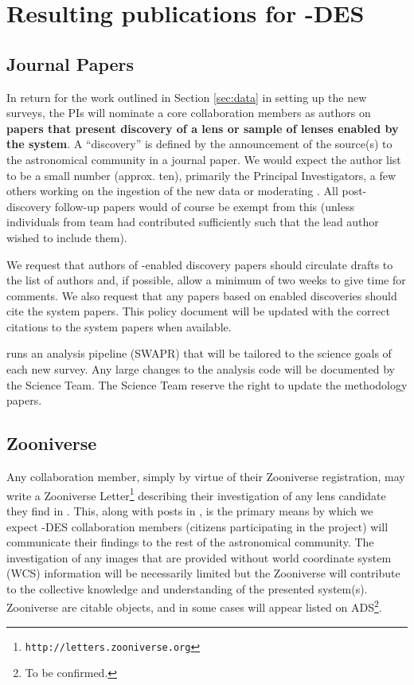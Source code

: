 \documentclass[a4paper,twocolumn]{article}
\begin{document}

\section{Resulting publications for \SW-DES }
\label{sec:series}

\subsection{Journal Papers}
\label{sec:papers}
In return for the work outlined in Section \ref{sec:data} in setting up the new surveys, the \SW PIs will nominate a core \SW collaboration members as authors on \textbf{papers that
present discovery of a lens or sample of lenses enabled by the \SW system}. A ``discovery'' is defined by the announcement of the source(s) to the astronomical community in a journal paper. We would expect the \SW author list to be a small number (approx. ten), primarily the Principal Investigators, a few others working on the ingestion of the new data or moderating \Talk. All post-discovery follow-up papers would of course be exempt from this (unless individuals from \sw team had contributed sufficiently such that the lead author wished to include them). 

We request that authors of \SW-enabled discovery papers should circulate drafts to the list of \SW authors and, if possible, allow a minimum of two weeks to give time for comments. We also request that any papers based on \SW enabled discoveries should cite the \SW system papers. This policy document will be updated with the correct citations to the \SW system papers when available.

\SW runs an analysis pipeline (SWAPR) that will be tailored to the science goals of each new survey. Any large changes to the analysis code will be documented  by the \SW Science Team. The \SW Science Team reserve the right to update the \SW methodology papers.



\subsection{Zooniverse \Letters}
\label{sec:comm}

Any \SW collaboration member, simply by virtue of their Zooniverse
registration, may write a Zooniverse
Letter\footnote{\texttt{http://letters.zooniverse.org}} describing their
investigation of any lens candidate they find in \SW. This, along with
posts in  \Talk, is the primary means by which we expect \SW-DES collaboration
members (citizens participating in the project) will communicate their findings to the rest of the
astronomical community. The investigation of any \SW images that are
provided without world coordinate system (WCS) information will be
necessarily limited but the \SW Zooniverse \Letters will contribute to the collective knowledge and understanding of the presented system(s). Zooniverse \Letters are citable \SW
objects, and in some cases will appear listed on ADS\footnote{To be confirmed.}. 
\end{document}
